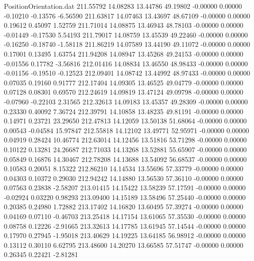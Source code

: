 \begin{filecontents}{PositionOrientation.dat}
 211.55792   14.08283   13.44786    49.19802   -0.00000    0.00000   -0.10210   -0.13576   -6.56590
 211.63817   14.07463   13.43697    48.67109   -0.00000    0.00000    0.19612    0.45097    1.52759
 211.71014   14.08875   13.46943    48.78103   -0.00000    0.00000   -0.01449   -0.17530    5.54193
 211.79017   14.08759   13.45539    49.22460   -0.00000    0.00000   -0.16250   -0.18740   -1.58118
 211.86219   14.07589   13.44190    49.11072   -0.00000    0.00000    0.17001    0.13495    1.63754
 211.94208   14.08947   13.45268    49.24153   -0.00000    0.00000   -0.01556    0.17782   -3.56816
 212.01416   14.08834   13.46550    48.98433   -0.00000    0.00000   -0.01156   -0.19510   -0.12523
 212.09401   14.08742   13.44992    48.97433   -0.00000    0.00000    0.07035    0.19160    0.91777
 212.17404   14.09305   13.46525    49.04779   -0.00000    0.00000    0.07128    0.08301    0.69570
 212.24619   14.09819   13.47124    49.09798   -0.00000    0.00000   -0.07960   -0.22103    2.31565
 212.32613   14.09183   13.45357    49.28309   -0.00000    0.00000    0.23330    0.40092    7.36724
 212.39791   14.10858   13.48235    49.81191   -0.00000    0.00000    0.14971    0.23721   23.29650
 212.47813   14.12059   13.50138    51.68064   -0.00000    0.00000    0.00543   -0.04584   15.97847
 212.55818   14.12102   13.49771    52.95971   -0.00000    0.00000    0.04919    0.28424   10.46774
 212.63014   14.12456   13.51816    53.71298   -0.00000    0.00000    0.10122    0.13281   24.26687
 212.71033   14.13268   13.52881    55.65907   -0.00000    0.00000    0.05849    0.16876   14.30467
 212.78208   14.13688   13.54092    56.68537   -0.00000    0.00000    0.10583    0.20051    8.15322
 212.86210   14.14534   13.55696    57.33779   -0.00000    0.00000    0.04303    0.10372    0.29030
 212.94242   14.14880   13.56530    57.36110   -0.00000    0.00000    0.07563    0.23838   -2.58207
 213.01415   14.15422   13.58239    57.17591   -0.00000    0.00000   -0.02924    0.03220    0.98293
 213.09400   14.15189   13.58496    57.25440   -0.00000    0.00000    0.20385    0.24980    1.72882
 213.17402   14.16820   13.60495    57.39274   -0.00000    0.00000    0.04169    0.07110   -0.46703
 213.25418   14.17154   13.61065    57.35530   -0.00000    0.00000    0.08758    0.12226   -2.91665
 213.32613   14.17785   13.61945    57.14544   -0.00000    0.00000    0.17970    0.27945   -1.95018
 213.40629   14.19225   13.64185    56.98912   -0.00000    0.00000    0.13112    0.30110    6.62795
 213.48600   14.20270   13.66585    57.51747   -0.00000    0.00000    0.26345    0.22421   -2.81281

\end{filecontents}
